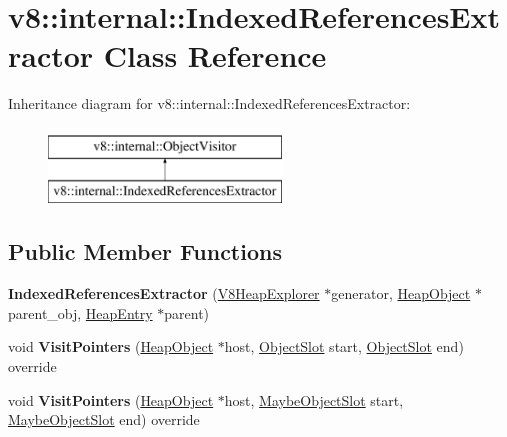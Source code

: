 \hypertarget{classv8_1_1internal_1_1IndexedReferencesExtractor}{}\section{v8\+:\+:internal\+:\+:Indexed\+References\+Extractor Class Reference}
\label{classv8_1_1internal_1_1IndexedReferencesExtractor}
Inheritance diagram for v8\+:\+:internal\+:\+:Indexed\+References\+Extractor\+:\begin{figure}[H]
\begin{center}
\leavevmode
\includegraphics[height=2.000000cm]{classv8_1_1internal_1_1IndexedReferencesExtractor}
\end{center}
\end{figure}
\subsection*{Public Member Functions}
\begin{DoxyCompactItemize}
\item 
\mbox{\label{classv8_1_1internal_1_1IndexedReferencesExtractor_aaeb0603a29e60eae6f86c395f0d58a55}} 
{\bfseries Indexed\+References\+Extractor} (\mbox{\hyperlink{classv8_1_1internal_1_1V8HeapExplorer}{V8\+Heap\+Explorer}} $\ast$generator, \mbox{\hyperlink{classv8_1_1internal_1_1HeapObject}{Heap\+Object}} $\ast$parent\+\_\+obj, \mbox{\hyperlink{classv8_1_1internal_1_1HeapEntry}{Heap\+Entry}} $\ast$parent)
\item 
\mbox{\label{classv8_1_1internal_1_1IndexedReferencesExtractor_ad426c42c2793f06fde1b53a1a08e0c66}} 
void {\bfseries Visit\+Pointers} (\mbox{\hyperlink{classv8_1_1internal_1_1HeapObject}{Heap\+Object}} $\ast$host, \mbox{\hyperlink{classv8_1_1internal_1_1ObjectSlot}{Object\+Slot}} start, \mbox{\hyperlink{classv8_1_1internal_1_1ObjectSlot}{Object\+Slot}} end) override
\item 
\mbox{\label{classv8_1_1internal_1_1IndexedReferencesExtractor_a39d77e9931eee7dfe56f917bc8c4b8f4}} 
void {\bfseries Visit\+Pointers} (\mbox{\hyperlink{classv8_1_1internal_1_1HeapObject}{Heap\+Object}} $\ast$host, \mbox{\hyperlink{classv8_1_1internal_1_1MaybeObjectSlot}{Maybe\+Object\+Slot}} start, \mbox{\hyperlink{classv8_1_1internal_1_1MaybeObjectSlot}{Maybe\+Object\+Slot}} end) override
\end{DoxyCompactItemize}


